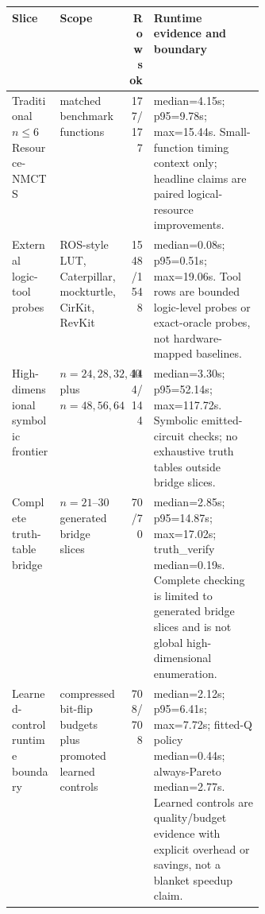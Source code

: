 \begin{tabularx}{\linewidth}{>{\raggedright\arraybackslash}p{0.19\linewidth}>{\raggedright\arraybackslash}p{0.18\linewidth}r>{\raggedright\arraybackslash}X}
\toprule
Slice & Scope & Rows ok & Runtime evidence and boundary \\
\midrule
Traditional $n\leq6$ Resource-NMCTS & 177 matched benchmark functions & 177/177 & median=4.15s; p95=9.78s; max=15.44s. Small-function timing context only; headline claims are paired logical-resource improvements. \\
External logic-tool probes & ROS-style LUT, Caterpillar, mockturtle, CirKit, RevKit & 1548/1548 & median=0.08s; p95=0.51s; max=19.06s. Tool rows are bounded logic-level probes or exact-oracle probes, not hardware-mapped baselines. \\
High-dimensional symbolic frontier & $n=24,28,32,40$ plus $n=48,56,64$ & 144/144 & median=3.30s; p95=52.14s; max=117.72s. Symbolic emitted-circuit checks; no exhaustive truth tables outside bridge slices. \\
Complete truth-table bridge & $n=21$--$30$ generated bridge slices & 70/70 & median=2.85s; p95=14.87s; max=17.02s; truth\_verify median=0.19s. Complete checking is limited to generated bridge slices and is not global high-dimensional enumeration. \\
Learned-control runtime boundary & compressed bit-flip budgets plus promoted learned controls & 708/708 & median=2.12s; p95=6.41s; max=7.72s; fitted-Q policy median=0.44s; always-Pareto median=2.77s. Learned controls are quality/budget evidence with explicit overhead or savings, not a blanket speedup claim. \\
\bottomrule
\end{tabularx}
